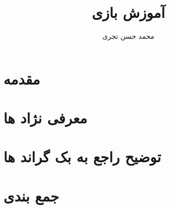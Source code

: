\documentclass{report}
\title{{\Huge آموزش بازی \lr{dungeon crawl stone soup}}}
\author{{\LARGE محمد حسن تجری}}
\date{{\LARGE}}
\begin{document}
\maketitle

\begin{persian}

  \tableofcontents

  \chapter*{مقدمه}

  \chapter{معرفی نژاد ها}

  \chapter{توضیح راجع به بک گراند ها}

  \chapter*{جمع بندی}

\end{persian}
\end{document}
